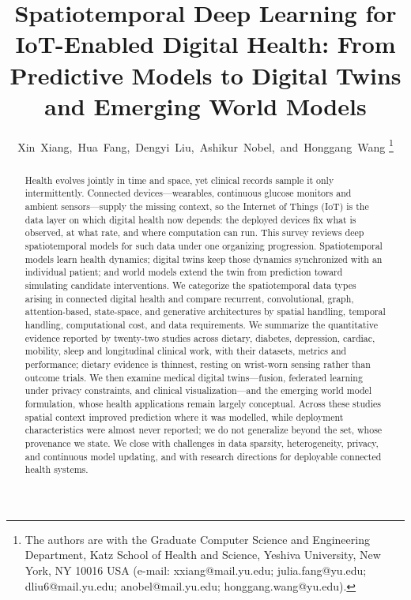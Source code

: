 \documentclass[journal]{IEEEtran}
\begin{document}
\title{Spatiotemporal Deep Learning for IoT-Enabled Digital Health: From Predictive Models to Digital Twins and Emerging World Models}

\author{Xin~Xiang,~Hua~Fang,~Dengyi~Liu,~Ashikur~Nobel,~and~Honggang~Wang%
\thanks{The authors are with the Graduate Computer Science and Engineering Department, Katz School of Health and Science, Yeshiva University, New York, NY 10016 USA (e-mail: xxiang@mail.yu.edu; julia.fang@yu.edu; dliu6@mail.yu.edu; anobel@mail.yu.edu; honggang.wang@yu.edu).}}

\maketitle

\begin{abstract}
Health evolves jointly in time and space, yet clinical records sample it only intermittently. Connected devices---wearables, continuous glucose monitors and ambient sensors---supply the missing context, so the Internet of Things (IoT) is the data layer on which digital health now depends: the deployed devices fix what is observed, at what rate, and where computation can run. This survey reviews deep spatiotemporal models for such data under one organizing progression. Spatiotemporal models learn health dynamics; digital twins keep those dynamics synchronized with an individual patient; and world models extend the twin from prediction toward simulating candidate interventions. We categorize the spatiotemporal data types arising in connected digital health and compare recurrent, convolutional, graph, attention-based, state-space, and generative architectures by spatial handling, temporal handling, computational cost, and data requirements. We summarize the quantitative evidence reported by twenty-two studies across dietary, diabetes, depression, cardiac, mobility, sleep and longitudinal clinical work, with their datasets, metrics and performance; dietary evidence is thinnest, resting on wrist-worn sensing rather than outcome trials. We then examine medical digital twins---fusion, federated learning under privacy constraints, and clinical visualization---and the emerging world model formulation, whose health applications remain largely conceptual. Across these studies spatial context improved prediction where it was modelled, while deployment characteristics were almost never reported; we do not generalize beyond the set, whose provenance we state. We close with challenges in data sparsity, heterogeneity, privacy, and continuous model updating, and with research directions for deployable connected health systems.
\end{abstract}
\end{document}
